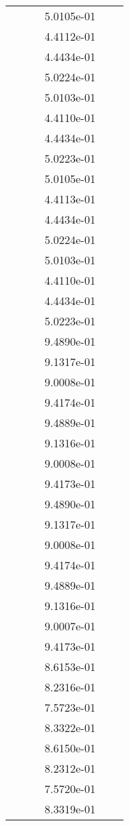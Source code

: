\begin{xltabular}{\textwidth}{r|rS[table-format=1.3e+2]S[table-format=1.4e+2]S[table-format=1.4e+2]S[table-format=-1.5]}
&  &  & 5.0105e-01 & & \\
&  &  & 4.4112e-01 & & \\
&  &  & 4.4434e-01 & & \\
&  &  & 5.0224e-01 & & \\
&  &  & 5.0103e-01 & & \\
&  &  & 4.4110e-01 & & \\
&  &  & 4.4434e-01 & & \\
&  &  & 5.0223e-01 & & \\
&  &  & 5.0105e-01 & & \\
&  &  & 4.4113e-01 & & \\
&  &  & 4.4434e-01 & & \\
&  &  & 5.0224e-01 & & \\
&  &  & 5.0103e-01 & & \\
&  &  & 4.4110e-01 & & \\
&  &  & 4.4434e-01 & & \\
&  &  & 5.0223e-01 & & \\
&  &  & 9.4890e-01 & & \\
&  &  & 9.1317e-01 & & \\
&  &  & 9.0008e-01 & & \\
&  &  & 9.4174e-01 & & \\
&  &  & 9.4889e-01 & & \\
&  &  & 9.1316e-01 & & \\
&  &  & 9.0008e-01 & & \\
&  &  & 9.4173e-01 & & \\
&  &  & 9.4890e-01 & & \\
&  &  & 9.1317e-01 & & \\
&  &  & 9.0008e-01 & & \\
&  &  & 9.4174e-01 & & \\
&  &  & 9.4889e-01 & & \\
&  &  & 9.1316e-01 & & \\
&  &  & 9.0007e-01 & & \\
&  &  & 9.4173e-01 & & \\
&  &  & 8.6153e-01 & & \\
&  &  & 8.2316e-01 & & \\
&  &  & 7.5723e-01 & & \\
&  &  & 8.3322e-01 & & \\
&  &  & 8.6150e-01 & & \\
&  &  & 8.2312e-01 & & \\
&  &  & 7.5720e-01 & & \\
&  &  & 8.3319e-01 & & \\

\end{xltabular}
